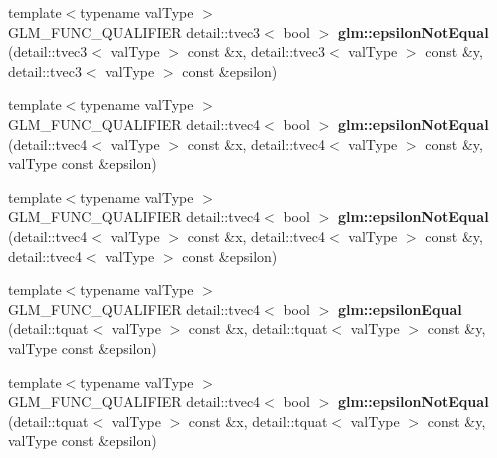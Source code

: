 \begin{DoxyCompactItemize}
\item 
\hypertarget{namespaceglm_aba2b7a190fc728c40e354ba5d0635f84}{}{\footnotesize template$<$typename val\+Type $>$ }\\G\+L\+M\+\_\+\+F\+U\+N\+C\+\_\+\+Q\+U\+A\+L\+I\+F\+I\+E\+R detail\+::tvec3$<$ bool $>$ {\bfseries glm\+::epsilon\+Not\+Equal} (detail\+::tvec3$<$ val\+Type $>$ const \&x, detail\+::tvec3$<$ val\+Type $>$ const \&y, detail\+::tvec3$<$ val\+Type $>$ const \&epsilon)\label{namespaceglm_aba2b7a190fc728c40e354ba5d0635f84}

\item 
\hypertarget{namespaceglm_a12d8fe2f853bf26756d761c6e21ef640}{}{\footnotesize template$<$typename val\+Type $>$ }\\G\+L\+M\+\_\+\+F\+U\+N\+C\+\_\+\+Q\+U\+A\+L\+I\+F\+I\+E\+R detail\+::tvec4$<$ bool $>$ {\bfseries glm\+::epsilon\+Not\+Equal} (detail\+::tvec4$<$ val\+Type $>$ const \&x, detail\+::tvec4$<$ val\+Type $>$ const \&y, val\+Type const \&epsilon)\label{namespaceglm_a12d8fe2f853bf26756d761c6e21ef640}

\item 
\hypertarget{namespaceglm_a1101f7185858450063577055752216e1}{}{\footnotesize template$<$typename val\+Type $>$ }\\G\+L\+M\+\_\+\+F\+U\+N\+C\+\_\+\+Q\+U\+A\+L\+I\+F\+I\+E\+R detail\+::tvec4$<$ bool $>$ {\bfseries glm\+::epsilon\+Not\+Equal} (detail\+::tvec4$<$ val\+Type $>$ const \&x, detail\+::tvec4$<$ val\+Type $>$ const \&y, detail\+::tvec4$<$ val\+Type $>$ const \&epsilon)\label{namespaceglm_a1101f7185858450063577055752216e1}

\item 
\hypertarget{namespaceglm_abf4c466d124db7dac9d451fb36d18d5b}{}{\footnotesize template$<$typename val\+Type $>$ }\\G\+L\+M\+\_\+\+F\+U\+N\+C\+\_\+\+Q\+U\+A\+L\+I\+F\+I\+E\+R detail\+::tvec4$<$ bool $>$ {\bfseries glm\+::epsilon\+Equal} (detail\+::tquat$<$ val\+Type $>$ const \&x, detail\+::tquat$<$ val\+Type $>$ const \&y, val\+Type const \&epsilon)\label{namespaceglm_abf4c466d124db7dac9d451fb36d18d5b}

\item 
\hypertarget{namespaceglm_a685d1e7297b207ed576a26624634ca5f}{}{\footnotesize template$<$typename val\+Type $>$ }\\G\+L\+M\+\_\+\+F\+U\+N\+C\+\_\+\+Q\+U\+A\+L\+I\+F\+I\+E\+R detail\+::tvec4$<$ bool $>$ {\bfseries glm\+::epsilon\+Not\+Equal} (detail\+::tquat$<$ val\+Type $>$ const \&x, detail\+::tquat$<$ val\+Type $>$ const \&y, val\+Type const \&epsilon)\label{namespaceglm_a685d1e7297b207ed576a26624634ca5f}

\end{DoxyCompactItemize}


